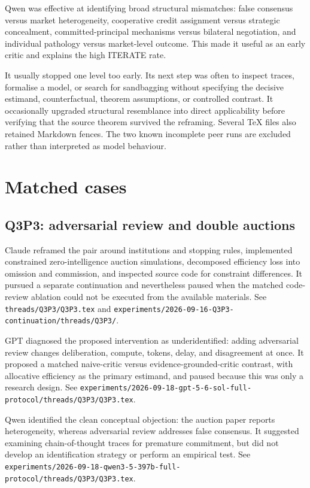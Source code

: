 \documentclass[11pt,a4paper]{article}
\newcommand{\file}[1]{\texttt{#1}}
\begin{document}
Qwen was effective at identifying broad structural mismatches: false consensus
versus market heterogeneity, cooperative credit assignment versus strategic
concealment, committed-principal mechanisms versus bilateral negotiation, and
individual pathology versus market-level outcome.  This made it useful as an
early critic and explains the high ITERATE rate.

It usually stopped one level too early.  Its next step was often to inspect
traces, formalise a model, or search for sandbagging without specifying the
decisive estimand, counterfactual, theorem assumptions, or controlled contrast.
It occasionally upgraded structural resemblance into direct applicability
before verifying that the source theorem survived the reframing.  Several TeX
files also retained Markdown fences.  The two known incomplete peer runs are
excluded rather than interpreted as model behaviour.

\section{Matched cases}

\subsection{Q3P3: adversarial review and double auctions}

Claude reframed the pair around institutions and stopping rules, implemented
constrained zero-intelligence auction simulations, decomposed efficiency loss
into omission and commission, and inspected source code for constraint
differences.  It pursued a separate continuation and nevertheless paused when
the matched code-review ablation could not be executed from the available
materials.  See \file{threads/Q3P3/Q3P3.tex} and
\file{experiments/2026-09-16-Q3P3-continuation/threads/Q3P3/}.

GPT diagnosed the proposed intervention as underidentified: adding adversarial
review changes deliberation, compute, tokens, delay, and disagreement at once.
It proposed a matched naive-critic versus evidence-grounded-critic contrast,
with allocative efficiency as the primary estimand, and paused because this
was only a research design.  See
\file{experiments/2026-09-18-gpt-5-6-sol-full-protocol/threads/Q3P3/Q3P3.tex}.

Qwen identified the clean conceptual objection: the auction paper reports
heterogeneity, whereas adversarial review addresses false consensus.  It
suggested examining chain-of-thought traces for premature commitment, but did
not develop an identification strategy or perform an empirical test.  See
\file{experiments/2026-09-18-qwen3-5-397b-full-protocol/threads/Q3P3/Q3P3.tex}.
\end{document}
